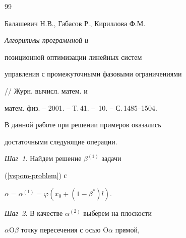 \begin{thebibliography}{99}


Балашевич Н.В., Габасов Р., Кириллова Ф.М. {\it Алгоритмы программной и


позиционной оптимизации линейных систем


управления с промежуточными фазовыми ограничениями} // Журн. вычисл. матем. и


матем. физ. -- 2001. -- Т.\,41. -- \No\,10. -- С.\,1485--1504.





\end{thebibliography}





\vskip 2cm







\smallskip






\smallskip









\label{end}

















В данной работе при решении примеров оказались


достаточными следующие операции.





{\it Шаг~1.} Найдем решение $\beta^{(1)}$ задачи


(\ref{vspom-problem}) с


$\alpha=\alpha^{(1)}=\varphi(x_0+(1-\beta^*)l)$.





{\it Шаг~2.} В качестве $\alpha^{(2)}$ выберем на плоскости


$\alpha$O$\beta$ точку пересечения с осью O$\alpha$ прямой,


